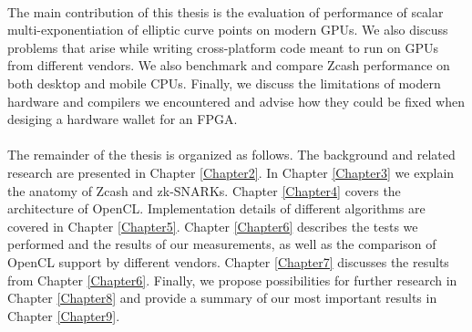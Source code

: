 \\
The main contribution of this thesis is the evaluation of performance of scalar multi-exponentiation of elliptic curve points on modern GPUs. We also discuss problems that arise while writing cross-platform code meant to run on GPUs from different vendors. We also benchmark and compare Zcash performance on both desktop and mobile CPUs. Finally, we discuss the limitations of modern hardware and compilers we encountered and advise how they could be fixed when desiging a hardware wallet for an FPGA.\\
\\
The remainder of the thesis is organized as follows. The background and related research are presented in Chapter \ref{Chapter2}. In Chapter \ref{Chapter3} we explain the anatomy of Zcash and zk-SNARKs. Chapter \ref{Chapter4} covers the architecture of OpenCL. Implementation details of different algorithms are covered in Chapter \ref{Chapter5}. Chapter \ref{Chapter6} describes the tests we performed and the results of our measurements, as well as the comparison of OpenCL support by different vendors. Chapter \ref{Chapter7} discusses the results from Chapter \ref{Chapter6}. Finally, we propose possibilities for further research in Chapter \ref{Chapter8} and provide a summary of our most important results in Chapter \ref{Chapter9}.
